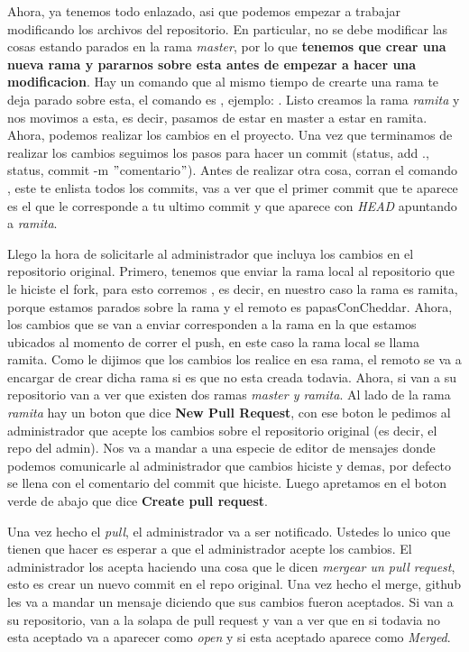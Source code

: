 \documentclass[10pt,journal,compsoc]{IEEEtran}
\begin{document}
Ahora, ya tenemos todo enlazado, asi que podemos empezar a trabajar modificando los archivos del repositorio. En particular, no se debe modificar las cosas estando parados en la rama \textit{master}, por lo que \textbf{tenemos que crear una nueva rama y pararnos sobre esta antes de empezar a hacer una modificacion}. Hay un comando que al mismo tiempo de crearte una rama te deja parado sobre esta, el comando es \textit{\color{Blue}{git checkout -b nombreDeLaNuevaRama}}, ejemplo: \textit{\color{Brown}{git checkout -b ramita}}. Listo creamos la rama \textit{ramita} y nos movimos a esta, es decir, pasamos de estar en master a estar en ramita. Ahora, podemos realizar los cambios en el proyecto. Una vez que terminamos de realizar los cambios seguimos los pasos para hacer un commit (status, add ., status, commit -m $"$comentario$"$). Antes de realizar otra cosa, corran el comando \textit{\color{Brown}{git log --online}}, este te enlista todos los commits, vas a ver que el primer commit que te aparece es el que le corresponde a tu ultimo commit y que aparece con \textit{HEAD} apuntando a \textit{ramita}. 

Llego la hora de solicitarle al administrador que incluya los cambios en el repositorio original. Primero, tenemos que enviar la rama local al repositorio que le hiciste el fork, para esto corremos \textit{\color{Brown}{git push remoto rama}}, es decir, en nuestro caso la rama es ramita, porque estamos parados sobre la rama y el remoto es papasConCheddar. Ahora, los cambios que se van a enviar corresponden a la rama en la que estamos ubicados al momento de correr el push, en este caso la rama local se llama ramita. Como le dijimos que los cambios los realice en esa rama, el remoto se va a encargar de crear dicha rama si es que no esta creada todavia. Ahora, si van a su repositorio van a ver que existen dos ramas \textit{master y ramita}. Al lado de la rama \textit{ramita} hay un boton que dice \textbf{New Pull Request}, con ese boton le pedimos al administrador que acepte los cambios sobre el repositorio original (es decir, el repo del admin). Nos va a mandar a una especie de editor de mensajes donde podemos comunicarle al administrador que cambios hiciste y demas, por defecto se llena con el comentario del commit que hiciste. Luego apretamos en el boton verde de abajo que dice \textbf{Create pull request}. 

Una vez hecho el \textit{pull}, el administrador va a ser notificado. Ustedes lo unico que tienen que hacer es esperar a que el administrador acepte los cambios. El administrador los acepta haciendo una cosa que le dicen \textit{mergear un pull request}, esto es crear un nuevo commit en el repo original. Una vez hecho el merge, github les va a mandar un mensaje diciendo que sus cambios fueron aceptados. Si van a su repositorio, van a la solapa de pull request y van a ver que en si todavia no esta aceptado  va a aparecer como \textit{open} y si esta aceptado aparece como \textit{Merged}. 
\end{document}

